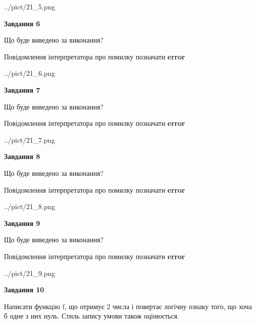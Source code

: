 \documentclass[12pt, ukrainian]{article}
\begin{document}
{\begin {large}
\begin{center}
	{../pict/21_5.png}
\end{center}
\newpage

{\begin {center}\textbf{Завдання 6}\end {center}}\par
Що буде виведено за виконання? \par
Повідомлення інтерпретатора про помилку позначати \textbf{error}

\begin{center}
	{../pict/21_6.png}
\end{center}
\newpage

{\begin {center}\textbf{Завдання 7}\end {center}}\par
Що буде виведено за виконання? \par
Повідомлення інтерпретатора про помилку позначати \textbf{error}

\begin{center}
	{../pict/21_7.png}
\end{center}
\newpage

{\begin {center}\textbf{Завдання 8}\end {center}}\par
Що буде виведено за виконання? \par
Повідомлення інтерпретатора про помилку позначати \textbf{error}

\begin{center}
	{../pict/21_8.png}
\end{center}
\newpage

{\begin {center}\textbf{Завдання 9}\end {center}}\par
Що буде виведено за виконання? \par
Повідомлення інтерпретатора про помилку позначати \textbf{error}

\begin{center}
	{../pict/21_9.png}
\end{center}
\newpage

{\begin {center}\textbf{Завдання 10}\end {center}}\par

Написати функцiю f, що отримує 2 числа і повертає логічну ознаку того, що хоча б одне з них нуль. Стиль запису умови також оцінюється.\par
\newpage

\end {large}}
\end{document}
